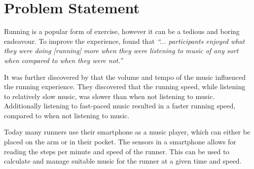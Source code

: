 \section{Problem Statement}
Running is a popular form of exercise, however it can be a tedious and boring endeavour.
To improve the experience, \citet{musicRunEffectArticle} found that 
\textit{``... participants enjoyed what they were doing [running] more when they were listening to music of any sort when compared to when they were not.''}

It was further discovered by \citet{musicRunEffectArticle} that the volume and tempo of the music influenced the running experience.
They discovered that the running speed, while listening to relatively slow music, was slower than when not listening to music. Additionally listening to fast-paced music resulted in a faster running speed, compared to when not listening to music.

Today many runners use their smartphone as a music player, which can either be placed on the arm or in their pocket.
The sensors in a smartphone allows for reading the steps per minute and speed of the runner. This can be used to calculate and manage suitable music for the runner at a given time and speed.


